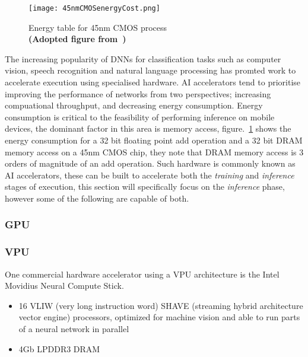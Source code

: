 \documentclass[../../D1.tex]{subfiles}
\begin{document}
 \begin{figure}[H]
    \begin{center}
        \texttt{[image: 45nmCMOSenergyCost.png]} 
    \end{center}
    
    \caption{Energy table for 45nm CMOS process\\ \textbf{(Adopted figure from~\autocite{hanLearningBothWeights2015})}}
    \label{fig:45nmCMOS}   
\end{figure}

 The increasing popularity of DNNs for classification tasks such as computer vision, speech recognition and natural language processing has promted work to accelerate execution using specialised hardware. 
 AI accelerators tend to prioritise improving the performance of networks from two perspectives; increasing compuational throughput, and decreasing energy consumption.
 Energy consumption is critical to the feasibility of performing inference on mobile devices, the dominant factor in this area is memory access, figure.~\ref{fig:45nmCMOS} shows the energy consumption for a 32 bit floating point add operation and a 32 bit DRAM memory access on a 45nm CMOS chip, they note that DRAM memory access is 3 orders of magnitude of an add operation.
 Such hardware is commonly known as AI accelerators, these can be built to accelerate both the \emph{training} and \emph{inference} stages of execution, this section will specifically focus on the \emph{inference} phase, however some of the following are capable of both.

\subsubsection{GPU}

\subsubsection{VPU}
One commercial hardware accelerator using a VPU architecture is the Intel Movidius Neural Compute Stick.
\begin{itemize}
    \item 16 VLIW (very long instruction word) SHAVE (streaming hybrid architecture vector engine) processors, optimized for machine vision and able to run parts of a neural network in parallel
    \item 4Gb LPDDR3 DRAM
\end{itemize}
\end{document}
